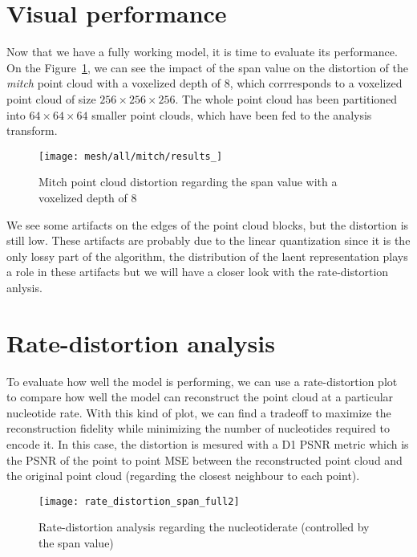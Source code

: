 
\label{sec:performance}


\section{Visual performance}

Now that we have a fully working model, it is time to evaluate its performance. On the Figure~\ref{fig:mitch-all}, we can see the impact of the span value on the distortion of the \textit{mitch} point cloud with a voxelized depth of $8$, which corrresponds to a voxelized point cloud of size $256 \times 256 \times 256$. 
The whole point cloud has been partitioned into $64 \times 64 \times 64$ smaller point clouds, which have been fed to the analysis transform.

\begin{figure}[ht]
    \centering
    \texttt{[image: mesh/all/mitch/results\_]}
    \caption{Mitch point cloud distortion regarding the span value with a voxelized depth of $8$}
    \label{fig:mitch-all}
\end{figure}

We see some artifacts on the edges of the point cloud blocks, but the distortion is still low. These artifacts are probably due to the linear quantization since it is the only lossy part of the algorithm, the distribution of the laent representation plays a role in these artifacts but we will have a closer look with the rate-distortion anlysis.

\section{Rate-distortion analysis}

To evaluate how well the model is performing, we can use a rate-distortion plot to compare how well the model can reconstruct the point cloud at a particular nucleotide rate. With this kind of plot, we can find a tradeoff to maximize the reconstruction fidelity while minimizing the number of nucleotides required to encode it.
In this case, the distortion is mesured with a D1 PSNR metric which is the PSNR of the point to point MSE between the reconstructed point cloud and the original point cloud (regarding the closest neighbour to each point).

\begin{figure}[ht]
    \centering
    \texttt{[image: rate\_distortion\_span\_full2]}
    \caption{Rate-distortion analysis regarding the nucleotiderate (controlled by the span value)}
    \label{fig:rate-distortion}
\end{figure}

